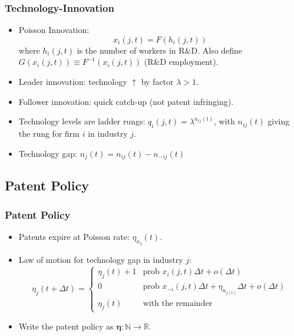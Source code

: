 \documentclass{beamer}
\begin{document}
\begin{frame}[t]\frametitle{Technology-Innovation} 
  \begin{itemize}
    \item<+-> Poisson Innovation:
      \begin{equation*} \label{eq:tech_rd_technology}
        x_i(j, t) = F(h_i(j, t))
      \end{equation*}
      where $h_i(j, t)$ is the number of workers in R\&D.
      Also define $G(x_i(j,t)) \equiv F^{-1}(x_i(j,t))$ (R\&D employment).
	  \vspace{2mm}
    \item<+-> Leader innovation: technology $\uparrow$ by factor $\lambda > 1$.
	\vspace{2mm}
    \item<+-> Follower innovation: quick catch-up (not patent infringing).
	\vspace{2mm}
    \item<+-> Technology levels are ladder rungs: $q_i(j, t) = \lambda^{n_{ij}(t)}$, with $n_{ij}(t)$ giving the rung for firm $i$ in industry $j$.
	\vspace{2mm}
    \item<+-> Technology gap: $n_j(t) = n_{ij}(t) - n_{-ij}(t)$
  \end{itemize}
\end{frame}

\subsection{Patent Policy}
\label{sub:patent_policy}

\begin{frame}[t]\frametitle{Patent Policy}
  \begin{itemize}
	  \vspace{2mm}
    \item<+-> Patents expire at Poisson rate: $\eta_{n_j}(t)$.
	\vspace{2mm}
    \item<+-> Law of motion for technology gap in industry $j$:
      \begin{equation*} \label{eq:tech_law_of_motion}
        \eta_j(t + \Delta t) =
        \begin{cases}
          \eta_j(t) + 1 & \textrm{prob } x_i(j,t)\Delta t + o(\Delta t)\\
          0 & \textrm{prob } x_{-i}(j,t)\Delta t + \eta_{n_{j(t)}}\Delta t + o(\Delta t) \\
          \eta_j(t) & \textrm{with the remainder} 
        \end{cases}
      \end{equation*}
  \vspace{2mm}
  \item<+-> Write the patent policy as $\bm{\eta} : \mathbb{N} \rightarrow \mathbb{R}$.
  \end{itemize}
\end{frame}
\end{document}
